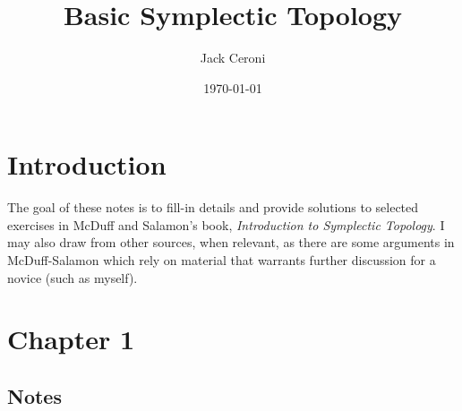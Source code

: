 \documentclass[aps,pra,showpacs,notitlepage,onecolumn,superscriptaddress,nofootinbib]{revtex4-1}
\theoremstyle{definition}
\begin{document}
\title{Basic Symplectic Topology}
\author{Jack Ceroni}
\date{\today}
\maketitle

\tableofcontents

\section{Introduction}

\noindent The goal of these notes is to fill-in details and provide solutions to selected exercises in McDuff and Salamon's book, \emph{Introduction to Symplectic Topology}.
I may also draw from other sources, when relevant, as there are some arguments in McDuff-Salamon which rely on material that warrants further discussion for a novice (such as myself).

\section{Chapter 1}

\subsection{Notes}
\end{document}
